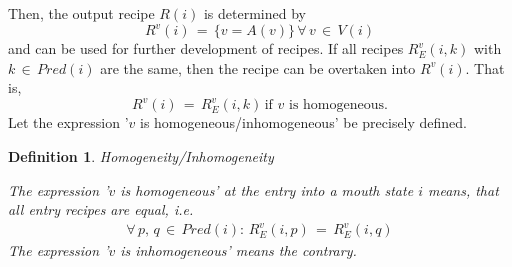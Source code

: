 \documentclass[12pt,a4paper]{scrartcl}
\newtheorem{definition}{Definition}
\begin{document}
Then, the output recipe $R(i)$ is determined by
\begin{equation}
    R^v(i) \,=\, \{ v = A(v) \}\,\forall\,v\,\in\,V(i)
\end{equation}
and can be used for further development of recipes. If all recipes $R^v_E(i,k)$
with $k\,\in\,Pred(i)$ are the same, then the recipe can be overtaken into
$R^v(i)$. That is,
\begin{equation}
    R^v(i) \,=\, R^v_E(i,k)\,\mbox{if $v$ is homogeneous}.
\end{equation}
Let the expression '$v$ is homogeneous/inhomogeneous' be precisely defined.
\begin{definition} Homogeneity/Inhomogeneity

    The expression '$v$ is homogeneous' at the entry into a mouth state $i$
    means, that all entry recipes are equal, i.e.
    \begin{equation}
        \begin{aligned}
        \forall\,p,\,q\,\in\,Pred(i):\,R_E^v(i,p)\,=\,R_E^v(i,q) 
        \end{aligned}
    \end{equation}
    The expression '$v$ is inhomogeneous' means the contrary.
\end{definition}
\end{document}
